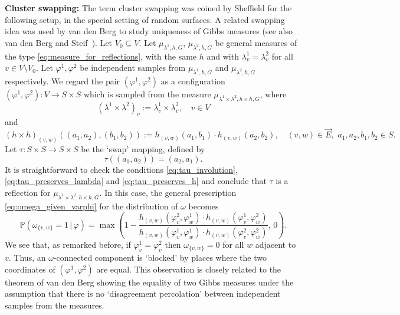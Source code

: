 \documentclass[english]{article}
\renewcommand{\P}{\mathbb{P}}
\theoremstyle{plain}
\theoremstyle{plain}
\begin{document}
{\bf Cluster swapping:} The term cluster
swapping was coined by Sheffield \cite[Chapter
8]{sheffield2005random} for the following setup, in the special
setting of random surfaces. A related swapping idea was used by van den Berg \cite{van1993uniqueness} to study uniqueness of Gibbs measures (see also van den Berg and Steif~\cite[Proof of Theorem 2.4]{van1994percolation}). Let $V_0\subseteq V$. Let $\mu_{\lambda^1, h, G}$, $\mu_{\lambda^2, h, G}$ be general measures of the type
\eqref{eq:measure_for_reflections}, with the same $h$ and with
$\lambda^1_v = \lambda^2_v$ for all $v\in V\setminus V_0$. Let
$\varphi^1, \varphi^2$ be independent samples from $\mu_{\lambda^1,
h, G}$ and $\mu_{\lambda^2, h, G}$ respectively. We regard the pair
$(\varphi^1, \varphi^2)$ as a configuration $(\varphi^1,
\varphi^2):V\to S\times S$ which is sampled from the measure
$\mu_{\lambda^1\times\lambda^2, h\times h, G}$, where
\begin{equation*}
  (\lambda^1\times\lambda^2)_v := \lambda^1_v \times \lambda^2_v,\quad v\in V
\end{equation*}
and
\begin{equation*}
  (h\times h)_{(v,w)}((a_1, a_2), (b_1, b_2)) := h_{(v,w)}(a_1,
  b_1)\cdot h_{(v,w)}(a_2, b_2),\quad (v,w)\in \vec{E},\,\,
  a_1,a_2,b_1,b_2\in S.
\end{equation*}
Let $\tau:S\times S\to S\times S$ be the `swap' mapping, defined by
\begin{equation}\label{eq:cluster_swapping_reflection}
\tau((a_1, a_2)) = (a_2, a_1).
\end{equation}
It is straightforward to check the
conditions \eqref{eq:tau_involution},
\eqref{eq:tau_preserves_lambda} and \eqref{eq:tau_preserves_h} and
conclude that $\tau$ is a reflection for
$\mu_{\lambda^1\times\lambda^2, h\times h, G}$. In this case, the
general prescription \eqref{eq:omega_given_varphi} for the
distribution of $\omega$ becomes
\begin{equation}\label{eq:cluster_swap_omega_probability}
  \P(\omega_{\{v,w\}} = 1\, |\, \varphi) = \max\left(1 -
  \frac{h_{(v,w)}(\varphi^2_v, \varphi^1_w)\cdot h_{(v,w)}(\varphi^1_v,\varphi^2_w)}{h_{(v,w)}(\varphi^1_v, \varphi^1_w)\cdot
  h_{(v,w)}(\varphi^2_v,\varphi^2_w)},\, 0\right).
\end{equation}
We see that, as remarked before, if $\varphi^1_v = \varphi^2_v$ then
$\omega_{\{v,w\}} = 0$ for all $w$ adjacent to $v$. Thus, an
$\omega$-connected component is `blocked' by places where the two
coordinates of $(\varphi^1, \varphi^2)$ are equal. This observation
is closely related to the theorem of van den Berg \cite[Theorem 1]{van1993uniqueness} showing the equality of two Gibbs measures under the assumption that
there is no `disagreement percolation' between independent samples
from the measures.
\end{document}
